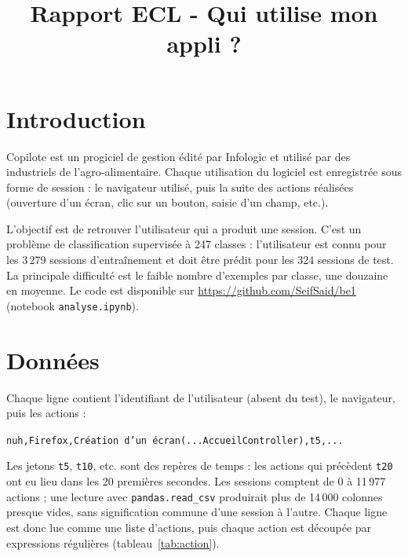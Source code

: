 \documentclass{rapportECL}
\title{Rapport ECL - Qui utilise mon appli ?}
\newcommand{\tok}[1]{\texttt{\small #1}}
\begin{document}




\fairepagedegarde
\fairemarges


\section{Introduction}

Copilote est un progiciel de gestion édité par Infologic et utilisé par des industriels de l'agro-alimentaire. Chaque utilisation du logiciel est enregistrée sous forme de session : le navigateur utilisé, puis la suite des actions réalisées (ouverture d'un écran, clic sur un bouton, saisie d'un champ, etc.).

L'objectif est de retrouver l'utilisateur qui a produit une session. C'est un problème de classification supervisée à 247 classes : l'utilisateur est connu pour les 3\,279 sessions d'entraînement et doit être prédit pour les 324 sessions de test. La principale difficulté est le faible nombre d'exemples par classe, une douzaine en moyenne. Le code est disponible sur \url{https://github.com/SeifSaid/be1} (notebook \tok{analyse.ipynb}).

\section{Données}

Chaque ligne contient l'identifiant de l'utilisateur (absent du test), le navigateur, puis les actions :

\begin{center}
\footnotesize\tok{nuh,Firefox,Création d'un écran(...AccueilController),t5,...}
\end{center}

Les jetons \tok{t5}, \tok{t10}, etc. sont des repères de temps : les actions qui précèdent \tok{t20} ont eu lieu dans les 20 premières secondes. Les sessions comptent de 0 à 11\,977 actions ; une lecture avec \tok{pandas.read\_csv} produirait plus de 14\,000 colonnes presque vides, sans signification commune d'une session à l'autre. Chaque ligne est donc lue comme une liste d'actions, puis chaque action est découpée par expressions régulières (tableau~\ref{tab:action}).
\end{document}
